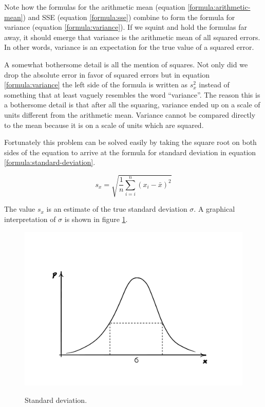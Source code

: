 \documentclass{tufte-book} %
\begin{document}
Note how the formulas for the arithmetic mean (equation \ref{formula:arithmetic-mean}) and SSE (equation \ref{formula:sse}) combine to form the formula for variance (equation \ref{formula:variance}). If we squint and hold the formulas far away, it should emerge that variance is the arithmetic mean of all squared errors. In other words, variance is an expectation for the true value of a squared error. 

A somewhat bothersome detail is all the mention of squares. Not only did we drop the absolute error in favor of squared errors but in equation \ref{formula:variance} the left side of the formula is written as $s_x^2$ instead of something that at least vaguely resembles the word ``variance''. The reason this is a bothersome detail is that after all the squaring, variance ended up on a scale of units different from the arithmetic mean. Variance cannot be compared directly to the mean because it is on a scale of units which are squared.

Fortunately this problem can be solved easily by taking the square root on both sides of the equation to arrive at the formula for standard deviation in equation \ref{formula:standard-deviation}.

\begin{equation} \label{formula:standard-deviation}
	s_x = \sqrt{\frac{1}{n} \sum_{i=i}^{n} (x_i - \bar{x})^2} 
\end{equation}

The value $s_x$ is an estimate of the true standard deviation $\sigma$. A graphical interpretation of $\sigma$ is shown in figure \ref{img:variance}.

\begin{figure}
	\centering
	\includegraphics[trim={4cm 3cm 4cm 5cm},clip]{graphics/variance}
	\label{img:variance}
	\caption{Standard deviation.}
\end{figure}
\end{document}
